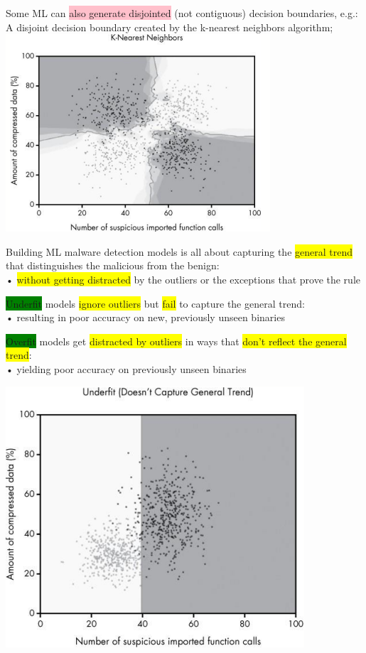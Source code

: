 \documentclass[]{project_plan}
\begin{document}
\newpage

Some ML can \colorbox{pink}{also generate disjointed} (not contiguous) decision boundaries, e.g.:\\
A disjoint decision boundary created by the k-nearest neighbors algorithm;\\
\includegraphics[width=.6\linewidth]{mlpg51.png}

Building ML malware detection models is all about capturing the \colorbox{yellow}{general trend}
that distinguishes the malicious from the benign:\\
• \colorbox{yellow}{without getting distracted} by the outliers or the exceptions that prove the rule

\colorbox{green}{Underfit} models \colorbox{yellow}{ignore outliers} but \colorbox{yellow}{fail} to capture the general trend:\\
• resulting in poor accuracy on new, previously unseen binaries

\colorbox{green}{Overfit} models get \colorbox{yellow}{distracted by outliers} in ways that \colorbox{yellow}{don’t reflect the general trend}:\\
• yielding poor accuracy on previously unseen binaries

\includegraphics[width=.6\linewidth]{ml53pg.png}
\end{document}

